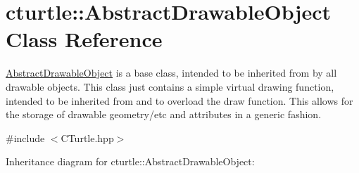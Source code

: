 \hypertarget{classcturtle_1_1AbstractDrawableObject}{}\section{cturtle\+:\+:Abstract\+Drawable\+Object Class Reference}
\label{classcturtle_1_1AbstractDrawableObject}


\hyperlink{classcturtle_1_1AbstractDrawableObject}{Abstract\+Drawable\+Object} is a base class, intended to be inherited from by all drawable objects. This class just contains a simple virtual drawing function, intended to be inherited from and to overload the draw function. This allows for the storage of drawable geometry/etc and attributes in a generic fashion.  




{\ttfamily \#include $<$C\+Turtle.\+hpp$>$}



Inheritance diagram for cturtle\+:\+:Abstract\+Drawable\+Object\+:
